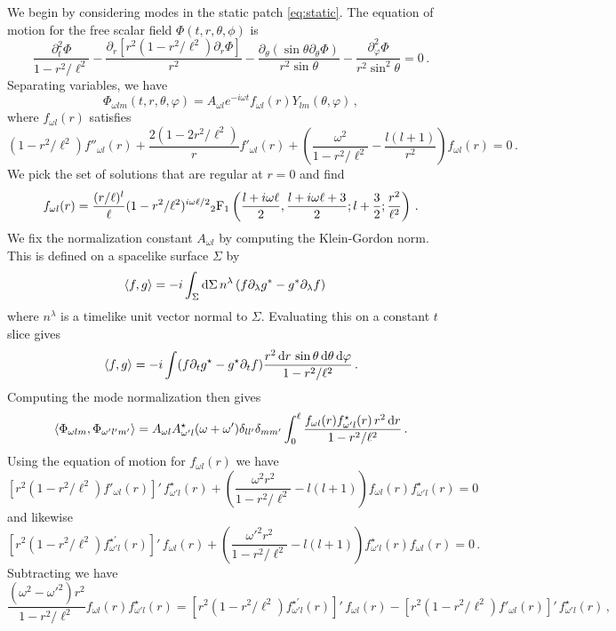 \documentclass{brownthesis}
\def\dd{{\rm d}}
\begin{document}
We begin by considering modes in the static patch \eqref{eq:static}.
The equation of motion for the free scalar field $\Phi(t,r,\theta,\phi)$
is
\[
\frac{\partial_{t}^{2}\Phi}{1-r^{2}/\ell^{2}}-\frac{\partial_{r}[r^{2}(1-r^{2}/\ell^{2})\partial_{r}\Phi]}{r^{2}}-\frac{\partial_{\theta}(\sin\theta\partial_{\theta}\Phi)}{r^{2}\sin\theta}-\frac{\partial_{\varphi}^{2}\Phi}{r^{2}\sin^{2}\theta}=0\,.
\]
Separating variables, we have
\[
\Phi_{\omega lm}(t,r,\theta,\varphi)=A_{\omega l}e^{-i\omega t}f_{\omega l}(r)Y_{lm}(\theta,\varphi)\,,
\]
where $f_{\omega l}(r)$ satisfies
\[
(1-r^{2}/\ell^{2})f''_{\omega l}(r)+\frac{2(1-2r^{2}/\ell^{2})}{r}f'_{\omega l}(r)+\left(\frac{\omega^{2}}{1-r^{2}/\ell^{2}}-\frac{l(l+1)}{r^{2}}\right)f_{\omega l}(r)=0\,.
\]
We pick the set of solutions that are regular at $r=0$ and find
\[
f_{\omega l}(r)=\frac{(r/\ell)^{l}}{\ell}(1-r^{2}/\ell^{2})^{i\omega\ell/2}{}_{2}{\rm F}_{1}\left(\frac{l+i\omega\ell}{2},\frac{l+i\omega\ell+3}{2};l+\frac{3}{2};\frac{r^{2}}{\ell^{2}}\right)\,.
\]
We fix the normalization constant $A_{\omega l}$ by computing the
Klein-Gordon norm. This is defined on a spacelike surface $\Sigma$
by
\begin{align*}
\left\langle f,g\right\rangle  & =-i\int_{\Sigma}\dd\Sigma\,n^{\lambda}\,(f\partial_{\lambda}g^{*}-g^{*}\partial_{\lambda}f)
\end{align*}
where $n^{\lambda}$ is a timelike unit vector normal to $\Sigma$.
Evaluating this on a constant $t$ slice gives
\begin{equation}
\left\langle f,g\right\rangle =-i\int(f\partial_{t}g^{\star}-g^{\star}\partial_{t}f)\frac{r^{2}\,\dd r\,\sin\theta\,\dd\theta\,\dd\varphi}{1-r^{2}/\ell^{2}}\,.\label{eq:innerprod}
\end{equation}
Computing the mode normalization then gives
\[
\left\langle \Phi_{\omega lm},\Phi_{\omega'l'm'}\right\rangle =A_{\omega l}A_{\omega'l}^{\star}(\omega+\omega')\delta_{ll'}\delta_{mm'}\int_{0}^{\ell}\frac{f_{\omega l}(r)f_{\omega'l}^{\star}(r)\,r^{2}\,\dd r}{1-r^{2}/\ell^{2}}\,.
\]
Using the equation of motion for $f_{\omega l}(r)$ we have
\[
[r^{2}(1-r^{2}/\ell^{2})f'_{\omega l}(r)]'\,f_{\omega'l}^{\star}(r)+\left(\frac{\omega^{2}r^{2}}{1-r^{2}/\ell^{2}}-l(l+1)\right)f_{\omega l}(r)f_{\omega'l}^{\star}(r)=0
\]
and likewise
\[
[r^{2}(1-r^{2}/\ell^{2})f_{\omega'l}^{\star\prime}(r)]'\,f_{\omega l}(r)+\left(\frac{\omega'^{2}r^{2}}{1-r^{2}/\ell^{2}}-l(l+1)\right)f_{\omega'l}^{\star}(r)f_{\omega l}(r)=0\,.
\]
Subtracting we have
\[
\frac{(\omega^{2}-\omega'^{2})r^{2}}{1-r^{2}/\ell^{2}}f_{\omega l}(r)f_{\omega'l}^{\star}(r)=[r^{2}(1-r^{2}/\ell^{2})f_{\omega'l}^{\star\prime}(r)]'\,f_{\omega l}(r)-[r^{2}(1-r^{2}/\ell^{2})f'_{\omega l}(r)]'\,f_{\omega'l}^{\star}(r)\,,
\]
\end{document}
